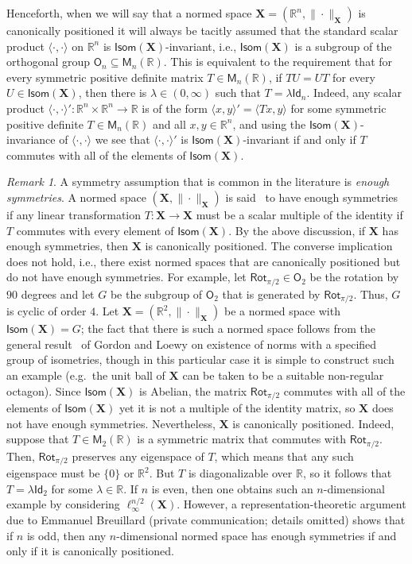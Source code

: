 \documentclass[11pt,reqno]{amsart}
\newcommand{\X}{\mathbf X}
\newcommand{\R}{\mathbb R}
\theoremstyle{remark}
\newtheorem{remark}[theorem]{Remark}
\newcommand{\Id}{\mathsf{Id}}
\newcommand{\M}{\mathsf{M}}
\renewcommand{\subset}{\subseteq}
\renewcommand{\1}{\mathbf 1}
\begin{document}
Henceforth, when we will say that a normed space $\X=(\R^n,\|\cdot\|_\X)$ is canonically positioned it will always be tacitly assumed that the standard scalar product $\langle\cdot,\cdot\rangle$ on $\R^n$ is $\mathsf{Isom}(\X)$-invariant, i.e., $\mathsf{Isom}(\X)$ is a subgroup of the orthogonal group $\mathsf{O}_n\subset \M_n(\R)$. This is equivalent to the requirement that for every symmetric positive definite matrix $T\in \M_n(\R)$, if $TU=UT$ for every $U\in \mathsf{Isom}(\X)$, then there is $\lambda\in (0,\infty)$ such that $T=\lambda \Id_n$. Indeed, any scalar product $\langle\cdot,\cdot\rangle':\R^n\times \R^n\to \R$ is of the form $\langle x,y\rangle'=\langle Tx,y\rangle$ for some symmetric positive definite $T\in \M_n(\R)$ and all $x,y\in \R^n$, and using the $\mathsf{Isom}(\X)$-invariance of $\langle\cdot,\cdot\rangle$ we see that  $\langle\cdot,\cdot\rangle'$ is $\mathsf{Isom}(\X)$-invariant if and only if $T$ commutes with all of the elements of $\mathsf{Isom}(\X)$.


\begin{remark}\label{rem:octagon} A symmetry assumption that is common in  the literature is {\em enough symmetries}. A normed space $(\X,\|\cdot\|_\X)$ is said~\cite{GG71} to have enough symmetries  if any linear transformation $T:\X\to \X$ must be a scalar multiple of the identity if $T$ commutes with every element of $\mathsf{Isom}(\X)$. By the above discussion, if $\X$ has enough symmetries, then $\X$ is canonically positioned. The converse implication does not hold, i.e., there exist normed spaces that are  canonically positioned but do not have enough symmetries. For example, let $\mathsf{Rot}_{\pi/2}\in \mathsf{O}_2$ be the rotation by $90$ degrees and let $G$ be the subgroup of $\mathsf{O}_2$ that is generated by $\mathsf{Rot}_{\pi/2}$. Thus, $G$ is cyclic of order $4$. Let $\X=(\R^2,\|\cdot\|_\X)$ be a normed space with $\mathsf{Isom}(\X)=G$; the fact that there is such a normed space  follows from the general result~\cite[Theorem~3.1]{GL79} of Gordon and Loewy on existence of norms with a specified group of isometries, though in this particular case it is simple to construct such an example (e.g.~the unit ball of $\X$ can be taken to be a suitable non-regular octagon). Since $\mathsf{Isom}(\X)$ is Abelian, the matrix $\mathsf{Rot}_{\pi/2}$ commutes with all of the elements of $\mathsf{Isom}(\X)$  yet it is not a multiple of the identity matrix, so $\X$ does not have enough symmetries. Nevertheless, $\X$ is canonically positioned. Indeed, suppose that $T\in \M_2(\R)$ is a symmetric matrix  that commutes with $\mathsf{Rot}_{\pi/2}$. Then, $\mathsf{Rot}_{\pi/2}$ preserves any eigenspace of $T$, which means that any such eigenspace must be $\{0\}$ or $\R^2$. But  $T$ is diagonalizable over $\R$, so it follows that $T=\lambda \Id_2$ for some $\lambda\in \R$. If $n$ is even, then one obtains such an $n$-dimensional example by considering $\ell_\infty^{n/2}(\X)$. However, a representation-theoretic argument due to Emmanuel Breuillard (private communication; details omitted) shows that if $n$ is odd, then any $n$-dimensional normed space has enough symmetries if and only if it is canonically positioned.
\end{remark}
\end{document}
